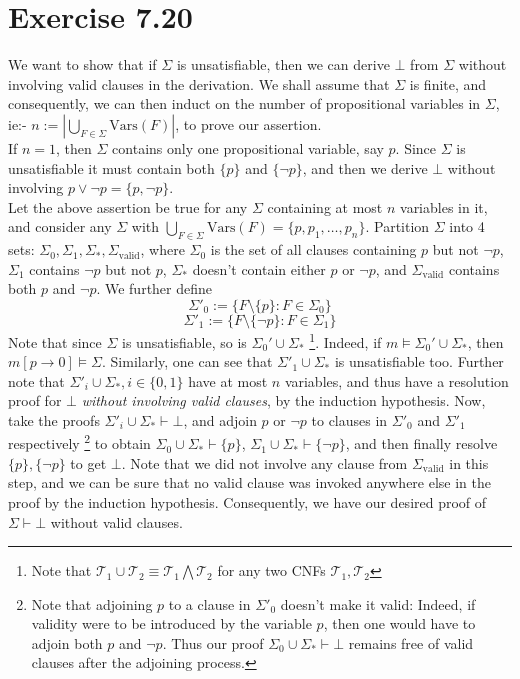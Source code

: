 \documentclass{article}
\newcommand{\Vars}{\mathrm{Vars}}
\begin{document}
\section*{Exercise 7.20}
We want to show that if $\Sigma$ is unsatisfiable, then we can derive $\bot$ from $\Sigma$ without involving valid clauses in the derivation. We shall assume that $\Sigma$ is finite, and consequently, we can then induct on the number of propositional variables in $\Sigma$, ie:- $n:= \left|\bigcup_{F\in\Sigma}\Vars(F)\right|$, to prove our assertion.\\
If $n = 1$, then $\Sigma$ contains only one propositional variable, say $p$. Since $\Sigma$ is unsatisfiable it must contain both $\{p\}$ and $\{\lnot p\}$, and then we derive $\bot$ without involving $p\lor\lnot p = \{p, \lnot p\}$.\\
Let the above assertion be true for any $\Sigma$ containing at most $n$ variables in it, and consider any $\Sigma$ with $\bigcup_{F\in\Sigma}\Vars(F) = \{p, p_1, \ldots, p_n\}$. Partition $\Sigma$ into 4 sets: $\Sigma_0, \Sigma_1, \Sigma_*, \Sigma_{\mathrm{valid}}$, where $\Sigma_0$ is the set of all clauses containing $p$ but not $\lnot p$, $\Sigma_1$ contains $\lnot p$ but not $p$, $\Sigma_*$ doesn't contain either $p$ or $\lnot p$, and $\Sigma_{\mathrm{valid}}$ contains both $p$ and $\lnot p$. We further define 
$$\Sigma'_0 := \{F\setminus\{p\}: F\in\Sigma_0\}$$
$$\Sigma'_1 := \{F\setminus\{\lnot p\}: F\in\Sigma_1\}$$
Note that since $\Sigma$ is unsatisfiable, so is $\Sigma_0'\cup\Sigma_*$ \footnote{Note that $\mathcal{T}_1\cup\mathcal{T}_2 \equiv \mathcal{T}_1\bigwedge\mathcal{T}_2$ for any two CNFs $\mathcal{T}_1, \mathcal{T}_2$}. Indeed, if $m\models\Sigma_0'\cup\Sigma_*$, then $m[p\rightarrow 0]\models\Sigma$. Similarly, one can see that $\Sigma'_1\cup\Sigma_*$ is unsatisfiable too. Further note that $\Sigma'_i\cup\Sigma_*, i\in\{0, 1\}$ have at most $n$ variables, and thus have a resolution proof for $\bot$ \emph{without involving valid clauses}, by the induction hypothesis. Now, take the proofs $\Sigma'_i\cup\Sigma_*\vdash\bot$, and adjoin $p$ or $\lnot p$ to clauses in $\Sigma'_0$ and $\Sigma'_1$ respectively \footnote{Note that adjoining $p$ to a clause in $\Sigma'_0$ doesn't make it valid: Indeed, if validity were to be introduced by the variable $p$, then one would have to adjoin both $p$ and $\lnot p$. Thus our proof $\Sigma_0\cup\Sigma_*\vdash\bot$ remains free of valid clauses after the adjoining process.} to obtain $\Sigma_0\cup\Sigma_*\vdash\{p\}$, $\Sigma_1\cup\Sigma_*\vdash\{\lnot p\}$, and then finally resolve $\{p\}, \{\lnot p\}$ to get $\bot$. Note that we did not involve any clause from $\Sigma_{\mathrm{valid}}$ in this step, and we can be sure that no valid clause was invoked anywhere else in the proof by the induction hypothesis. Consequently, we have our desired proof of $\Sigma\vdash\bot$ without valid clauses.
\end{document}
